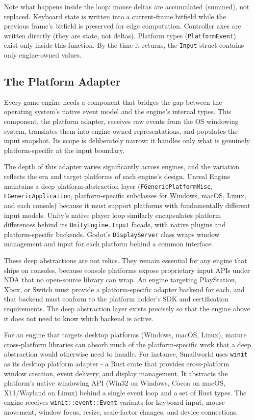 \documentclass[
  11pt,
  letterpaper,
  DIV=11,
  numbers=noendperiod,
  twoside,
  open=right]{scrreprt}
\begin{document}
Note what happens inside the loop: mouse deltas are accumulated
(summed), not replaced. Keyboard state is written into a current-frame
bitfield while the previous frame's bitfield is preserved for edge
computation. Controller axes are written directly (they are state, not
deltas). Platform types (\texttt{PlatformEvent}) exist only inside this
function. By the time it returns, the \texttt{Input} struct contains
only engine-owned values.

\subsection{The Platform Adapter}\label{the-platform-adapter}

Every game engine needs a component that bridges the gap between the
operating system's native event model and the engine's internal types.
This component, the platform adapter, receives raw events from the OS
windowing system, translates them into engine-owned representations, and
populates the input snapshot. Its scope is deliberately narrow: it
handles only what is genuinely platform-specific at the input boundary.

The depth of this adapter varies significantly across engines, and the
variation reflects the era and target platforms of each engine's design.
Unreal Engine maintains a deep platform-abstraction layer
(\texttt{FGenericPlatformMisc}, \texttt{FGenericApplication},
platform-specific subclasses for Windows, macOS, Linux, and each
console) because it must support platforms with fundamentally different
input models. Unity's native player loop similarly encapsulates platform
differences behind its \texttt{UnityEngine.Input} facade, with native
plugins and platform-specific backends. Godot's \texttt{DisplayServer}
class wraps window management and input for each platform behind a
common interface.

These deep abstractions are not relics. They remain essential for any
engine that ships on consoles, because console platforms expose
proprietary input APIs under NDA that no open-source library can wrap.
An engine targeting PlayStation, Xbox, or Switch must provide a
platform-specific adapter backend for each, and that backend must
conform to the platform holder's SDK and certification requirements. The
deep abstraction layer exists precisely so that the engine above it does
not need to know which backend is active.

For an engine that targets desktop platforms (Windows, macOS, Linux),
mature cross-platform libraries can absorb much of the platform-specific
work that a deep abstraction would otherwise need to handle. For
instance, Smallworld uses \texttt{winit} as its desktop platform adapter
- a Rust crate that provides cross-platform window creation, event
delivery, and display management. It abstracts the platform's native
windowing API (Win32 on Windows, Cocoa on macOS, X11/Wayland on Linux)
behind a single event loop and a set of Rust types. The engine receives
\texttt{winit::event::Event} variants for keyboard input, mouse
movement, window focus, resize, scale-factor changes, and device
connections.
\end{document}
